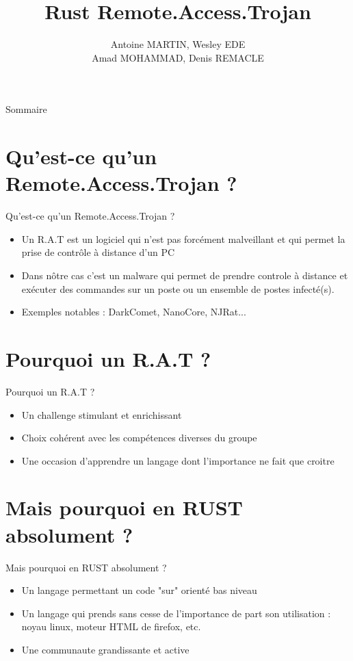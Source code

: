 \documentclass{beamer}
\title{Rust Remote.Access.Trojan}
\author{Antoine MARTIN, Wesley EDE\\Amad MOHAMMAD, Denis REMACLE}
\begin{document}
  \begin{frame}
 \maketitle
  \end{frame}

\begin{frame}{Sommaire}
    \tableofcontents
\end{frame}

\section{Qu'est-ce qu'un Remote.Access.Trojan ?}
  \begin{frame}{Qu'est-ce qu'un Remote.Access.Trojan ?}
  \begin{itemize}
	\item Un R.A.T est un logiciel qui n'est pas forcément malveillant et qui permet la prise de contrôle à distance d'un PC
	\item Dans nôtre cas c'est un malware qui permet de prendre controle à distance et exécuter des commandes sur un poste ou un ensemble de postes infecté(s).
	\item Exemples notables : DarkComet, NanoCore, NJRat...
  \end{itemize}
  \end{frame}

\section{Pourquoi un R.A.T ?}
  \begin{frame}{Pourquoi un R.A.T ?}
  \begin{itemize}
	\item Un challenge stimulant et enrichissant
	\item Choix cohérent avec les compétences diverses du groupe
	\item Une occasion d'apprendre un langage dont l'importance ne fait que croitre
  \end{itemize}
  \end{frame}



\section{Mais pourquoi en RUST absolument ?}
  \begin{frame}{Mais pourquoi en RUST absolument ?}
  \begin{itemize}
	\item Un langage permettant un code "sur" orienté bas niveau
	\item Un langage qui prends sans cesse de l'importance de part son utilisation : noyau linux, moteur HTML de firefox, etc.
	\item Une communaute grandissante et active
  \end{itemize}
  \end{frame}
\end{document}
